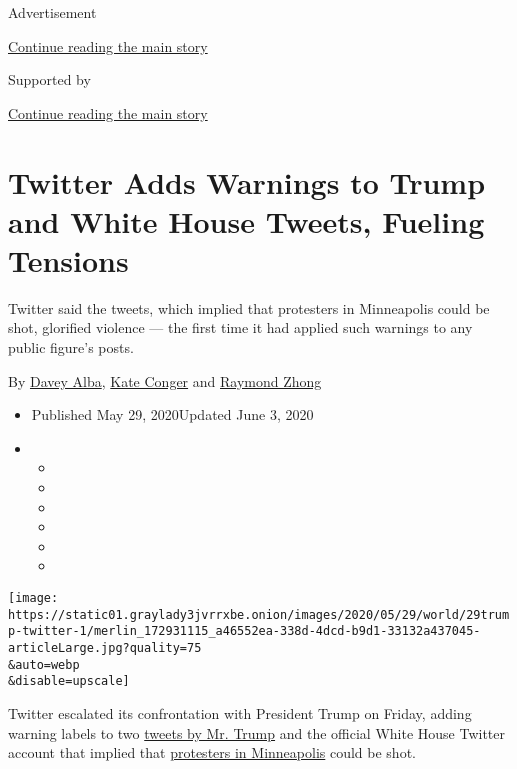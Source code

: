 Advertisement

\protect\hyperlink{after-top}{Continue reading the main story}

Supported by

\protect\hyperlink{after-sponsor}{Continue reading the main story}

\hypertarget{twitter-adds-warnings-to-trump-and-white-house-tweets-fueling-tensions}{%
\section{Twitter Adds Warnings to Trump and White House Tweets, Fueling
Tensions}\label{twitter-adds-warnings-to-trump-and-white-house-tweets-fueling-tensions}}

Twitter said the tweets, which implied that protesters in Minneapolis
could be shot, glorified violence --- the first time it had applied such
warnings to any public figure's posts.

By \href{https://www.nytimes3xbfgragh.onion/by/davey-alba}{Davey Alba},
\href{https://www.nytimes3xbfgragh.onion/by/kate-conger}{Kate Conger}
and \href{https://www.nytimes3xbfgragh.onion/by/raymond-zhong}{Raymond
Zhong}

\begin{itemize}
\item
  Published May 29, 2020Updated June 3, 2020
\item
  \begin{itemize}
  \item
  \item
  \item
  \item
  \item
  \item
  \end{itemize}
\end{itemize}

\texttt{[image: https://static01.graylady3jvrrxbe.onion/images/2020/05/29/world/29trump-twitter-1/merlin\_172931115\_a46552ea-338d-4dcd-b9d1-33132a437045-articleLarge.jpg?quality=75\\\&auto=webp\\\&disable=upscale]}

Twitter escalated its confrontation with President Trump on Friday,
adding warning labels to two
\href{https://www.nytimes3xbfgragh.onion/2020/06/03/us/politics/trump-twitter-fact-check.html}{tweets
by Mr. Trump} and the official White House Twitter account that implied
that
\href{https://www.nytimes3xbfgragh.onion/2020/05/30/us/george-floyd-minneapolis.html}{protesters
in Minneapolis} could be shot.

